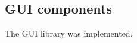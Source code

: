 \subsection{GUI components}
\label{backlog:GUI_components}

The \giraf[] GUI library was implemented.

